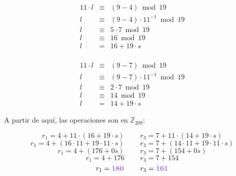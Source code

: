 \documentclass[10pt,spanish]{article}
\begin{document}
\begin{description}
    \begin{minipage}{0.5\textwidth}
    \begin{displaymath}
    \begin{matrix}
    11 \cdot l & \equiv & (9 - 4) \bmod 19 \\
    l & \equiv & (9 - 4) \cdot 11^{-1} \bmod 19\\
    l & \equiv & 5 \cdot 7 \bmod 19\\
    l & \equiv & 16 \bmod 19\\
    l & = & 16 + 19 \cdot s \\
    \end{matrix}     
    \end{displaymath}
    \end{minipage}
    \begin{minipage}{0.5\textwidth}
    \begin{displaymath}
    \begin{matrix}
    11 \cdot l & \equiv & (9 - 7) \bmod 19 \\
    l & \equiv & (9 - 7) \cdot 11^{-1} \bmod 19\\
    l & \equiv & 2 \cdot 7 \bmod 19\\
    l & \equiv & 14 \bmod 19\\
    l & = & 14 + 19 \cdot s
    \end{matrix}     
    \end{displaymath}
    \end{minipage}

    A partir de aquí, las operaciones son en $\mathbb{Z}_{209}$: 

    \begin{displaymath}
        r_1 = 4 + 11 \cdot (16 + 19 \cdot s) \qquad\ r_3 = 7 + 11 \cdot (14 + 19 \cdot s)
    \end{displaymath}
    \begin{displaymath}
        r_1 = 4 + (16 \cdot 11 + 19  \cdot 11 \cdot s) \qquad\ r_3 = 7 + (14 \cdot 11 + 19 \cdot 11 \cdot s)
    \end{displaymath}
    \begin{displaymath}
        r_1 = 4 + (176 + 0s) \qquad\ r_3 = 7 + (154 + 0s)
    \end{displaymath}
    \begin{displaymath}
        r_1 = 4 + 176 \qquad\ r_3 = 7 + 154
    \end{displaymath}
    \begin{displaymath}
        r_1 = \mathbf{\textcolor{morado}{180}} \qquad\ r_3 = \mathbf{\textcolor{morado}{161}}
    \end{displaymath}



\end{description}
\end{document}
